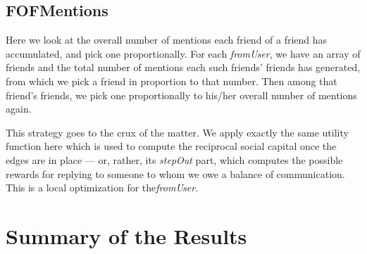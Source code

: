 \documentclass[10pt,oneside]{memoir}
\begin{document}
\subsection{FOFMentions}
\label{fofmentions}

Here we look at the overall number of mentions each friend of a friend has accumulated, and pick one proportionally.  For each \emph{fromUser}, we have an array of friends and the total number of mentions each such friends' friends has generated, from which we pick a friend in proportion to that number.  Then among that friend's friends, we pick one proportionally to his/her overall number of mentions again.


This strategy goes to the crux of the matter.  We apply exactly the same utility function here which is used to compute the reciprocal social capital once the edges are in place --- or, rather, its \emph{stepOut} part, which computes the possible rewards for replying to someone to whom we owe a balance of communication.  This is a local optimization for the\emph{fromUser}. 


\pagebreak \section{Summary of the Results}
\label{summaryoftheresults}
\end{document}
